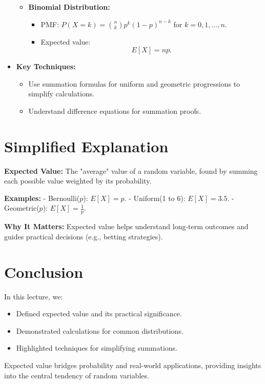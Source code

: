 \documentclass{article}
\begin{document}
\begin{itemize}
\begin{itemize}
      \item \textbf{Binomial Distribution:}
        \begin{itemize}
          \item PMF: $P(X = k) = \binom{n}{k}p^k(1 - p)^{n-k}$ for $k = 0, 1, \dots, n$.
          \item Expected value:
            \[
              E[X] = np.
            \]
        \end{itemize}
    \end{itemize}

  \item \textbf{Key Techniques:}
    \begin{itemize}
      \item Use summation formulas for uniform and geometric progressions to simplify calculations.
      \item Understand difference equations for summation proofs.
    \end{itemize}
\end{itemize}

\section*{Simplified Explanation}

\textbf{Expected Value:}
The "average" value of a random variable, found by summing each possible value weighted by its probability.

\textbf{Examples:}
- Bernoulli($p$): $E[X] = p$.
- Uniform(1 to 6): $E[X] = 3.5$.
- Geometric($p$): $E[X] = \frac{1}{p}$.

\textbf{Why It Matters:}
Expected value helps understand long-term outcomes and guides practical decisions (e.g., betting strategies).

\section*{Conclusion}

In this lecture, we:
\begin{itemize}
  \item Defined expected value and its practical significance.
  \item Demonstrated calculations for common distributions.
  \item Highlighted techniques for simplifying summations.
\end{itemize}

Expected value bridges probability and real-world applications, providing insights into the central tendency of random variables.
\end{document}
